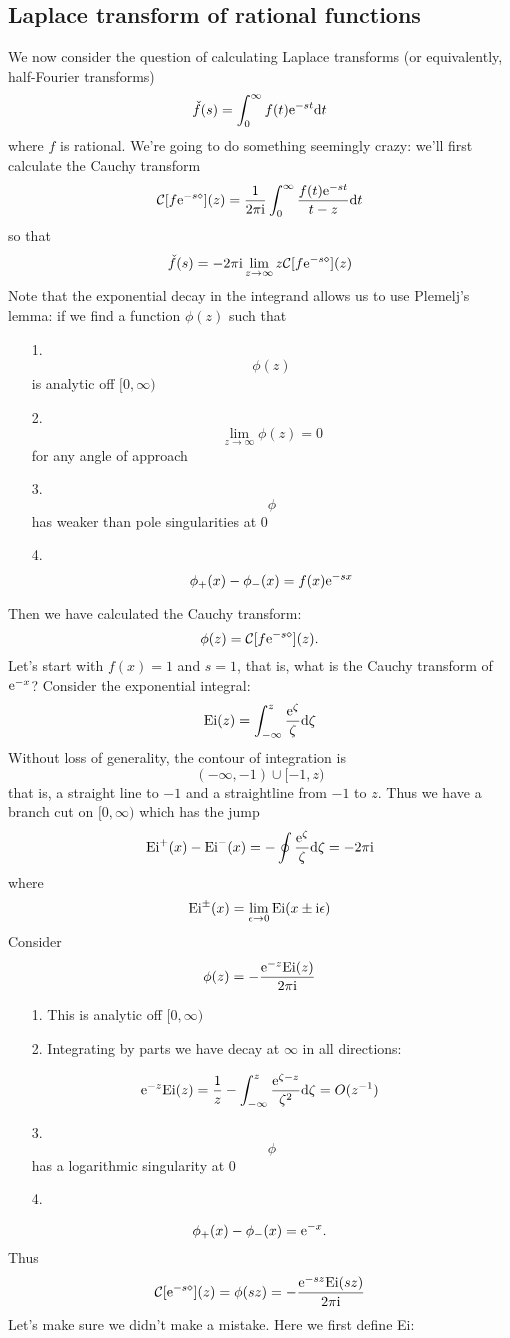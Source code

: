 \documentclass[12pt,landscape]{article}
\def\D{ {\rm d} }
\def\I{ {\rm i} }
\def\E{ {\rm e} }
\def\CC{ {\cal C} }
\begin{document}
{\subsection{Laplace transform of rational functions}
We now consider the question of calculating Laplace transforms (or equivalently, half-Fourier transforms)
\[
\check f(s) = \int_0^\infty f(t) \E^{-s t} \D t
\]
where $f$ is rational. We're going to do something seemingly crazy: we'll first calculate the Cauchy transform
\[
\CC[f \E^{-s \diamond}](z) = {1 \over 2 \pi \I} \int_0^\infty {f(t) \E^{-s t} \over t- z} \D t
\]
so that
\[
\check f(s) = -2 \pi \I\lim_{z \rightarrow \infty}  z \CC[f \E^{-s \diamond}](z)
\]
Note that the exponential decay in the integrand allows us to use Plemelj's lemma: if we find a function $\phi(z)$ such that
\begin{itemize}
\item[1. ] \[
\phi(z)
\]
is analytic off $[0,\infty)$
\item[2. ] \[
\lim_{z \rightarrow \infty} \phi(z) = 0
\]
for any angle of approach
\item[3. ] \[
\phi
\]
has weaker than pole singularities at 0
\item[4. ] \[
\phi_+(x) - \phi_-(x) = f(x) \E^{-s x}
\]
\end{itemize}
Then we have calculated the Cauchy transform:
\[
\phi(z) = \CC[f \E^{-s \diamond}](z).
\]
Let's start with $f(x) = 1$ and $s = 1$, that is, what is the Cauchy transform of $\E^{-x}$? Consider the exponential integral:
\[
{\rm Ei}(z) = \int_{-\infty}^z {\E^\zeta \over \zeta} \D \zeta
\]
Without loss of generality, the contour of integration is
\[
(-\infty,-1) \cup [-1, z)
\]
that is, a straight line to $-1$ and a straightline from $-1$ to $z$. Thus we have a branch cut on $[0,\infty)$ which has the jump
\[
{\rm Ei}^+(x) - {\rm Ei}^-(x) = -\oint {\E^\zeta \over \zeta} \D \zeta = -2 \pi \I
\]
where
\[
{\rm Ei}^\pm(x) = \lim_{\epsilon \rightarrow 0} {\rm Ei}(x\pm\I \epsilon)
\]
Consider
\[
\phi(z) = -{\E^{-z} {\rm Ei}(z) \over 2 \pi \I }
\]
\begin{itemize}
\item[1. ] This is analytic off $[0,\infty)$
\item[2. ] Integrating by parts we have decay at $\infty$ in all directions:
\end{itemize}
\[
\E^{-z} {\rm Ei}(z) = {1  \over z}  - \int_{-\infty}^z {\E^{\zeta-z} \over \zeta^2} \D \zeta = O(z^{-1})
\]
\begin{itemize}
\item[3. ] \[
\phi
\]
has a logarithmic singularity at 0
\item[4. ] \end{itemize}
\[
\phi_+(x) - \phi_-(x) = \E^{-x}.
\]
Thus
\[
\CC[ \E^{-s \diamond}](z) = \phi(s z) = - {\E^{-s z} {\rm Ei}(s z)  \over 2 \pi \I}
\]
\newpage
Let's make sure we didn't make a mistake. Here we first define Ei:


}
\end{document}
